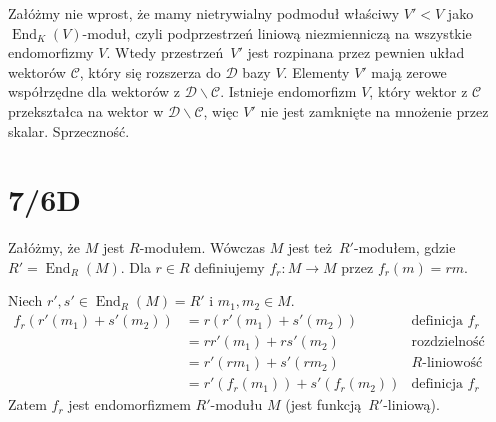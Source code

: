 \documentclass[a4paper, 12pt]{article}
\DeclareMathOperator{\End}{End}
\newcommand{\+}{\enspace}
\begin{document}
Załóżmy nie wprost, że mamy nietrywialny podmoduł właściwy $V' < V$ jako
$\End_K(V)$-moduł,
czyli podprzestrzeń liniową niezmienniczą na wszystkie endomorfizmy $V$.
Wtedy przestrzeń $V'$ jest rozpinana przez pewnien układ wektorów $\mathcal{C}$,
który się rozszerza do $\mathcal{D}$ bazy $V$.
Elementy $V'$ mają zerowe współrzędne dla wektorów z
$\mathcal{D} ∖ \mathcal{C}$.
Istnieje endomorfizm $V$, który wektor z $\mathcal{C}$ przekształca
na wektor w $\mathcal{D} ∖ \mathcal{C}$, więc $V'$ nie jest zamknięte
na mnożenie przez skalar.
Sprzeczność.

\newpage
\section*{7/6D}
Załóżmy, że $M$ jest $R$-modułem.
Wówczas $M$ jest też $R'$-modułem, gdzie $R' = \End_R(M)$.
Dla $r ∈ R$ definiujemy $f_r: M → M$ przez $f_r(m) = rm$.

Niech $r', s' ∈ \End_R(M)=R'$ i $m_1,m_2 ∈ M$.
\begin{align*}
f_r(r'(m_1) + s'(m_2))
	&= r(r'(m_1) + s'(m_2)) &\text{definicja }f_r \\
	&= rr'(m_1) + rs'(m_2) &\text{rozdzielność mnożenia skalarnego} \\
	&= r'(r m_1) + s'(r m_2) &\text{$R$-liniowość} \\
	&= r'(f_r(m_1)) + s'(f_r(m_2)) &\text{definicja }f_r
\end{align*}
Zatem $f_r$ jest endomorfizmem $R'$-modułu $M$ (jest funkcją $R'$-liniową).
\end{document}
